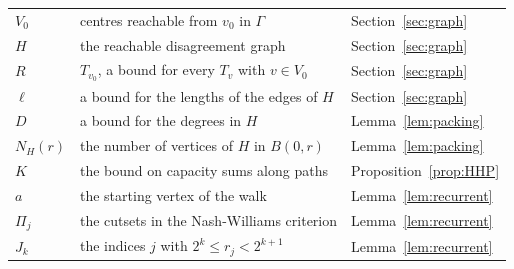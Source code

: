 \documentclass[11pt]{amsart}
\theoremstyle{remark}
\numberwithin{equation}{section}
\begin{document}
\begin{center}
\begin{tabular}{@{}lp{}l@{}}
$V_0$ & centres reachable from $v_0$ in $\Gamma$ & Section~\ref{sec:graph} \\
$H$ & the reachable disagreement graph & Section~\ref{sec:graph} \\
$R$ & $T_{v_0}$, a bound for every $T_v$ with $v\in V_0$ & Section~\ref{sec:graph} \\
$\ell$ & a bound for the lengths of the edges of $H$ & Section~\ref{sec:graph} \\
$D$ & a bound for the degrees in $H$ & Lemma~\ref{lem:packing} \\
$N_H(r)$ & the number of vertices of $H$ in $B(0,r)$ & Lemma~\ref{lem:packing} \\
$K$ & the bound on capacity sums along paths & Proposition~\ref{prop:HHP} \\
$a$ & the starting vertex of the walk & Lemma~\ref{lem:recurrent} \\
$\Pi_j$ & the cutsets in the Nash-Williams criterion & Lemma~\ref{lem:recurrent} \\
$J_k$ & the indices $j$ with $2^k\le r_j<2^{k+1}$ & Lemma~\ref{lem:recurrent} \\
\bottomrule
\end{tabular}
\end{center}
\end{document}
